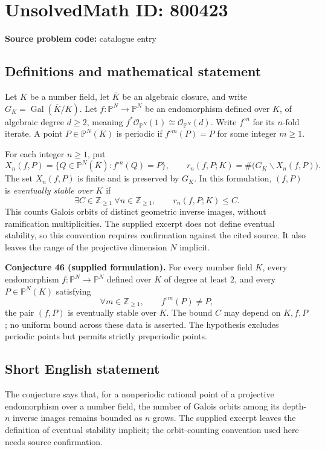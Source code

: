 \documentclass[11pt]{article}
\newcommand{\Z}{\mathbb{Z}}
\newcommand{\PP}{\mathbb{P}}
\begin{document}
\section*{UnsolvedMath ID: 800423}
\textbf{Source problem code:} catalogue entry
\subsection{Definitions and mathematical statement}
Let \(K\) be a number field, let \(\overline K\) be an algebraic closure, and write \(G_K=\operatorname{Gal}(\overline K/K)\). Let \(f:\PP^N\to\PP^N\) be an endomorphism defined over \(K\), of algebraic degree \(d\ge 2\), meaning \(f^*\mathcal O_{\PP^N}(1)\cong\mathcal O_{\PP^N}(d)\). Write \(f^{\circ n}\) for its \(n\)-fold iterate. A point \(P\in\PP^N(K)\) is periodic if \(f^{\circ m}(P)=P\) for some integer \(m\ge 1\).

For each integer \(n\ge 1\), put
\[
X_n(f,P)=\{Q\in\PP^N(\overline K):f^{\circ n}(Q)=P\},
\qquad
r_n(f,P;K)=\#\bigl(G_K\backslash X_n(f,P)\bigr).
\]
The set \(X_n(f,P)\) is finite and is preserved by \(G_K\). In this formulation, \((f,P)\) is \emph{eventually stable over \(K\)} if
\[
\exists C\in\Z_{\ge 1}\ \forall n\in\Z_{\ge 1},\qquad r_n(f,P;K)\le C.
\]
This counts Galois orbits of distinct geometric inverse images, without ramification multiplicities. The supplied excerpt does not define eventual stability, so this convention requires confirmation against the cited source. It also leaves the range of the projective dimension \(N\) implicit.

\textbf{Conjecture 46 (supplied formulation).} For every number field \(K\), every endomorphism \(f:\PP^N\to\PP^N\) defined over \(K\) of degree at least \(2\), and every \(P\in\PP^N(K)\) satisfying
\[
\forall m\in\Z_{\ge 1},\qquad f^{\circ m}(P)\ne P,
\]
the pair \((f,P)\) is eventually stable over \(K\). The bound \(C\) may depend on \(K,f,P\); no uniform bound across these data is asserted. The hypothesis excludes periodic points but permits strictly preperiodic points.
\subsection{Short English statement}
The conjecture says that, for a nonperiodic rational point of a projective endomorphism over a number field, the number of Galois orbits among its depth-\(n\) inverse images remains bounded as \(n\) grows. The supplied excerpt leaves the definition of eventual stability implicit; the orbit-counting convention used here needs source confirmation.
\end{document}
